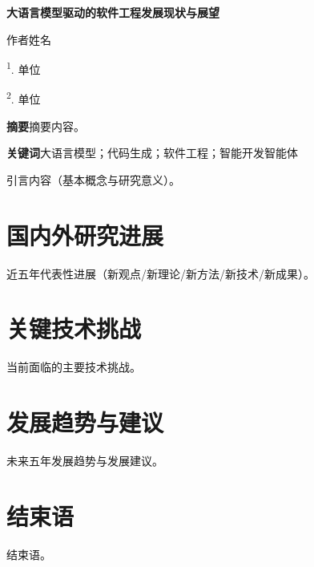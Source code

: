 \documentclass[UTF8,a4paper,zihao=-4]{ctexart}
\newcommand{\papertitle}{大语言模型驱动的软件工程发展现状与展望}
\newcommand{\paperauthors}{作者姓名}
\newcommand{\affiliationone}{\textsuperscript{1}. 单位}
\newcommand{\affiliationtwo}{\textsuperscript{2}. 单位}
\newcommand{\paperabstract}{摘要内容。}
\newcommand{\paperkeywords}{大语言模型；代码生成；软件工程；智能开发智能体}
\newcommand{\makecnarticlehead}{%
  \begin{flushleft}
    {\fontsize{14pt}{18pt}\selectfont\heiti\bfseries \papertitle\par}
    \vspace{0.8em}
    {\fontsize{11pt}{15pt}\selectfont \paperauthors\par}
    \vspace{0.4em}
    {\fontsize{10pt}{14pt}\selectfont \affiliationone\par}
    {\fontsize{10pt}{14pt}\selectfont \affiliationtwo\par}
  \end{flushleft}
  \vspace{1.0em}
}
\begin{document}
\makecnarticlehead

\noindent\textbf{摘要}\quad \paperabstract

\vspace{0.4em}
\noindent\textbf{关键词}\quad \paperkeywords

\vspace{1.0em}
引言内容（基本概念与研究意义）。

\section{国内外研究进展}
\label{sec:progress}
近五年代表性进展（新观点/新理论/新方法/新技术/新成果）。

\section{关键技术挑战}
\label{sec:challenges}
当前面临的主要技术挑战。

\section{发展趋势与建议}
\label{sec:trends}
未来五年发展趋势与发展建议。

\section{结束语}
\label{sec:conclusion}
结束语。



\end{document}
